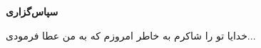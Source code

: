
\clearpage
\thispagestyle{empty}

{\BNazaninScaleOne
{\fontsize{20pt}{0}\selectfont \bfseries
\noindent
سپاس‌گزاری
}}
\vspace{0.5cm}

{\BNazaninScaleOne
{\fontsize{12pt}{0.9cm}\selectfont %
\noindent
خدایا تو را شاکرم به خاطر امروزم که به من عطا فرمودی...






}}

\restoregeometry